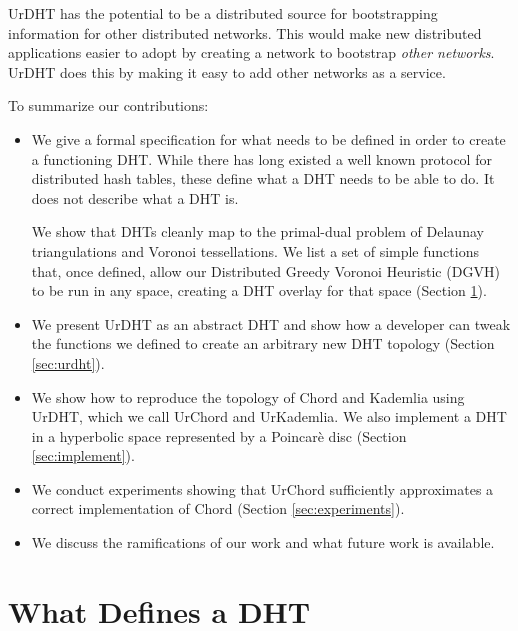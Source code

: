\documentclass[11pt,conference]{IEEEtran}
\begin{document}
UrDHT has the potential to be a distributed source for bootstrapping information for other distributed networks.
This would make new distributed applications easier to adopt by creating a network to bootstrap \textit{other networks}.
UrDHT does this by making it easy to add other networks as a service.

To summarize our contributions:
\begin{itemize}
	\item We give a formal specification for what needs to be defined in order to create a functioning DHT.
	While there has long existed a well known protocol for distributed hash tables, these define what a DHT needs to be able to do.
	It does not describe what a DHT is.
	
	We show that DHTs cleanly map to the primal-dual problem of Delaunay triangulations and Voronoi tessellations.
	We list a set  of simple functions that, once defined, allow our Distributed Greedy Voronoi Heuristic (DGVH) to be run in any space, creating a DHT overlay for that space (Section \ref{sec:define}).
	
	\item We present UrDHT as an abstract DHT and show how a developer can tweak the functions we defined to create an arbitrary new DHT topology (Section \ref{sec:urdht}).
	\item We show how to reproduce the topology of Chord and Kademlia using UrDHT, which we call UrChord and UrKademlia.
	We also implement a DHT in a hyperbolic  space represented  by a Poincar\`{e} disc (Section \ref{sec:implement}).
	
	\item We conduct experiments showing that UrChord sufficiently approximates a correct implementation of Chord (Section \ref{sec:experiments}). 
	\item We discuss the ramifications of our work and what future work is available.
\end{itemize}


\section{What Defines a DHT}
\label{sec:define}
\end{document}
